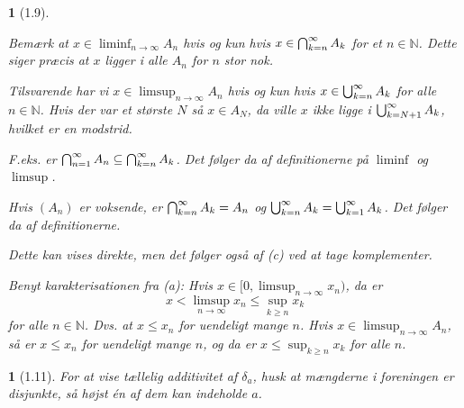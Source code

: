 \documentclass[a4paper, 11pt, article, danish, oneside]{memoir}
\newcommand{\naturals}{\mathbb{N}}
\DeclareMathOperator*{\smallbigcup}{\textstyle\bigcup}
\DeclareMathOperator*{\bigunion}{\mathchoice
    {\smallbigcup}%
    {\bigcup}%
    {\bigcup}%
    {\bigcup}%
}
\DeclareMathOperator*{\smallbigcap}{\textstyle\bigcap}
\DeclareMathOperator*{\bigintersect}{\mathchoice
    {\smallbigcap}%
    {\bigcap}%
    {\bigcap}%
    {\bigcap}%
}
\newcommand{\pencilsymbol}{\raisebox{-2pt}{\normalfont\PencilLeft}}
\theoremstyle{changedotcustomnumber}
\newtheorem{opgave}{\pencilsymbol}
\theoremstyle{changedotbreakcustomnumber}
\newtheorem{opgavebreak}{\pencilsymbol}
\begin{document}
\begin{opgavebreak}[1.9]
\begin{solutionsec}
    \item Bemærk at $x \in \liminf_{n\to\infty} A_n$ hvis og kun hvis $x \in \bigintersect_{k=n}^\infty A_k$ for et $n \in \naturals$. Dette siger præcis at $x$ ligger i alle $A_n$ for $n$ stor nok.

    Tilsvarende har vi $x \in \limsup_{n\to\infty} A_n$ hvis og kun hvis $x \in \bigunion_{k=n}^\infty A_k$ for alle $n \in \naturals$. Hvis der var et største $N$ så $x \in A_N$, da ville $x$ ikke ligge i $\bigunion_{k=N+1}^\infty A_k$, hvilket er en modstrid.

    \item F.eks. er $\bigintersect_{n=1}^\infty A_n \subseteq \bigintersect_{k=n}^\infty A_k$. Det følger da af definitionerne på $\liminf$ og $\limsup$.

    \item Hvis $(A_n)$ er voksende, er $\bigintersect_{k=n}^\infty A_k = A_n$ og $\bigunion_{k=n}^\infty A_k = \bigunion_{k=1}^\infty A_k$. Det følger da af definitionerne.

    \item Dette kan vises direkte, men det følger også af (c) ved at tage komplementer.

    \item Benyt karakterisationen fra (a): Hvis $x \in [0,\limsup_{n\to\infty} x_n)$, da er
    \begin{equation*}
        x
            < \limsup_{n\to\infty} x_n
            \leq \sup_{k \geq n} x_k
    \end{equation*}
    for alle $n \in \naturals$. Dvs. at $x \leq x_n$ for uendeligt mange $n$. Hvis $x \in \limsup_{n\to\infty} A_n$, så er $x \leq x_n$ for uendeligt mange $n$, og da er $x \leq \sup_{k \geq n} x_k$ for alle $n$.
\end{solutionsec}
\end{opgavebreak}

\begin{opgave}[1.11]
    For at vise tællelig additivitet af $\delta_a$, husk at mængderne i foreningen er disjunkte, så højst én af dem kan indeholde $a$.
\end{opgave}
\end{document}
